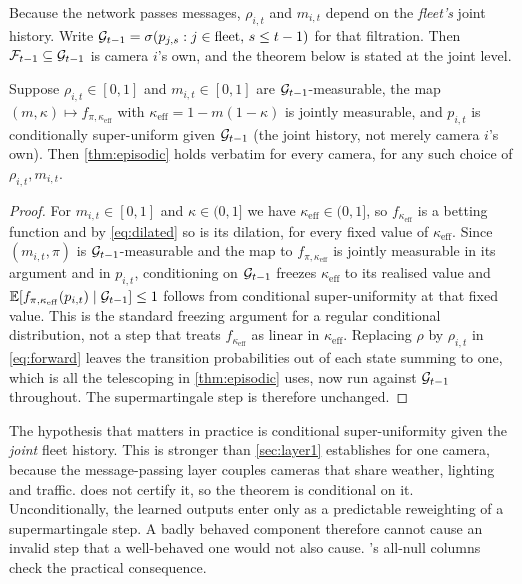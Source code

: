 Because the network passes messages, $\rho_{i,t}$ and $m_{i,t}$ depend on the \emph{fleet's} joint history. Write $\mathcal{G}_{t-1} = \sigma(p_{j,s} : j \in \text{fleet},\, s \le t-1)$ for that filtration. Then $\mathcal{F}_{t-1} \subseteq \mathcal{G}_{t-1}$ is camera $i$'s own, and the theorem below is stated at the joint level.

\begin{theorem}
\label{thm:predictable}
Suppose $\rho_{i,t} \in [0,1]$ and $m_{i,t} \in [0,1]$ are
$\mathcal{G}_{t-1}$-measurable, the map $(m,\kappa) \mapsto f_{\pi,\kappa_{\mathrm{eff}}}$
with $\kappa_{\mathrm{eff}} = 1-m(1-\kappa)$ is jointly measurable, and $p_{i,t}$
is conditionally super-uniform given $\mathcal{G}_{t-1}$ (the joint history, not
merely camera $i$'s own). Then \cref{thm:episodic} holds verbatim for every
camera, for any such choice of $\rho_{i,t}, m_{i,t}$.
\end{theorem}

\begin{proof}
For $m_{i,t} \in [0,1]$ and $\kappa \in (0,1]$ we have
$\kappa_{\mathrm{eff}} \in (0,1]$, so $f_{\kappa_{\mathrm{eff}}}$ is a betting
function and by \cref{eq:dilated} so is its dilation, for every fixed value of
$\kappa_{\mathrm{eff}}$. Since $(m_{i,t}, \pi)$ is $\mathcal{G}_{t-1}$-measurable and
the map to $f_{\pi,\kappa_{\mathrm{eff}}}$ is jointly measurable in its
argument and in $p_{i,t}$, conditioning on $\mathcal{G}_{t-1}$ freezes
$\kappa_{\mathrm{eff}}$ to its realised value and
$\mathbb{E}[f_{\pi,\kappa_{\mathrm{eff}}}(p_{i,t}) \mid \mathcal{G}_{t-1}] \le 1$
follows from conditional super-uniformity at that fixed value. This is the
standard freezing argument for a regular conditional distribution, not a
step that treats $f_{\kappa_{\mathrm{eff}}}$ as linear in $\kappa_{\mathrm{eff}}$.
Replacing $\rho$ by $\rho_{i,t}$ in \cref{eq:forward} leaves the transition
probabilities out of each state summing to one, which is all the telescoping in
\cref{thm:episodic} uses, now run against $\mathcal{G}_{t-1}$ throughout. The
supermartingale step is therefore unchanged.
\end{proof}

The hypothesis that matters in practice is conditional super-uniformity given the \emph{joint} fleet history. This is stronger than \cref{sec:layer1} establishes for one camera, because the message-passing layer couples cameras that share weather, lighting and traffic.  does not certify it, so the theorem is conditional on it. Unconditionally, the learned outputs enter only as a predictable reweighting of a supermartingale step. A badly behaved component therefore cannot cause an invalid step that a well-behaved one would not also cause. 's all-null columns check the practical consequence.

